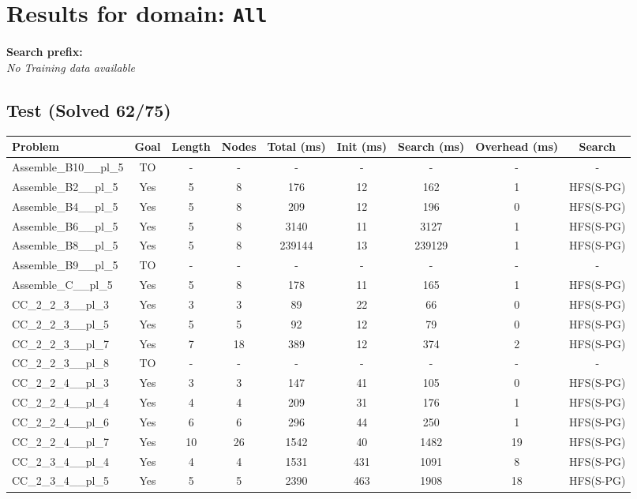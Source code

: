 \documentclass{article}
\begin{document}
\section*{Results for domain: \texttt{All}}
\textbf{Search prefix:} 
\\[0.5cm]
\textit{No Training data available}\\[0.5cm]
\subsection*{Test (Solved 62/75)}
\begin{tabular}{lcccccccc}
\toprule
Problem & Goal & Length & Nodes & Total (ms) & Init (ms) & Search (ms) & Overhead (ms) & Search \\
\midrule
Assemble\_B10\_\_pl\_5 & TO & - & - & - & - & - & - & - \\
Assemble\_B2\_\_pl\_5 & Yes & 5 & 8 & 176 & 12 & 162 & 1 & HFS(S-PG) \\
Assemble\_B4\_\_pl\_5 & Yes & 5 & 8 & 209 & 12 & 196 & 0 & HFS(S-PG) \\
Assemble\_B6\_\_pl\_5 & Yes & 5 & 8 & 3140 & 11 & 3127 & 1 & HFS(S-PG) \\
Assemble\_B8\_\_pl\_5 & Yes & 5 & 8 & 239144 & 13 & 239129 & 1 & HFS(S-PG) \\
Assemble\_B9\_\_pl\_5 & TO & - & - & - & - & - & - & - \\
Assemble\_C\_\_pl\_5 & Yes & 5 & 8 & 178 & 11 & 165 & 1 & HFS(S-PG) \\
CC\_2\_2\_3\_\_pl\_3 & Yes & 3 & 3 & 89 & 22 & 66 & 0 & HFS(S-PG) \\
CC\_2\_2\_3\_\_pl\_5 & Yes & 5 & 5 & 92 & 12 & 79 & 0 & HFS(S-PG) \\
CC\_2\_2\_3\_\_pl\_7 & Yes & 7 & 18 & 389 & 12 & 374 & 2 & HFS(S-PG) \\
CC\_2\_2\_3\_\_pl\_8 & TO & - & - & - & - & - & - & - \\
CC\_2\_2\_4\_\_pl\_3 & Yes & 3 & 3 & 147 & 41 & 105 & 0 & HFS(S-PG) \\
CC\_2\_2\_4\_\_pl\_4 & Yes & 4 & 4 & 209 & 31 & 176 & 1 & HFS(S-PG) \\
CC\_2\_2\_4\_\_pl\_6 & Yes & 6 & 6 & 296 & 44 & 250 & 1 & HFS(S-PG) \\
CC\_2\_2\_4\_\_pl\_7 & Yes & 10 & 26 & 1542 & 40 & 1482 & 19 & HFS(S-PG) \\
CC\_2\_3\_4\_\_pl\_4 & Yes & 4 & 4 & 1531 & 431 & 1091 & 8 & HFS(S-PG) \\
CC\_2\_3\_4\_\_pl\_5 & Yes & 5 & 5 & 2390 & 463 & 1908 & 18 & HFS(S-PG) \\

\end{tabular}
\end{document}
